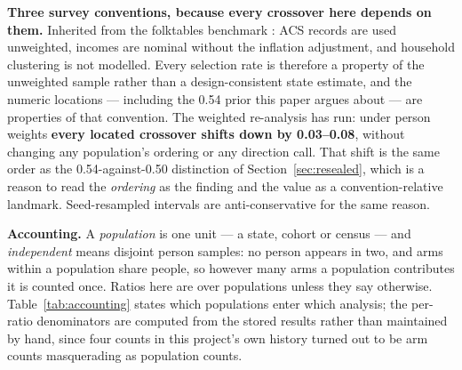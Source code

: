 \documentclass[conference]{IEEEtran}
\begin{document}
\textbf{Three survey conventions, because every crossover here depends on them.} Inherited
from the folktables benchmark \cite{ding2021}: ACS records are used unweighted, incomes are
nominal without the inflation adjustment, and household clustering is not modelled. Every
selection rate is therefore a property of the unweighted sample rather than a
design-consistent state estimate, and the numeric locations --- including the 0.54 prior this
paper argues about --- are properties of that convention. The weighted re-analysis has run:
under person weights \textbf{every located crossover shifts down by 0.03--0.08}, without
changing any population's ordering or any direction call. That shift is the same order as the
0.54-against-0.50 distinction of Section~\ref{sec:resealed}, which is a reason to read the
\emph{ordering} as the finding and the value as a convention-relative landmark.
Seed-resampled intervals are anti-conservative for the same reason.

\textbf{Accounting.} A \emph{population} is one unit --- a state, cohort or census --- and
\emph{independent} means disjoint person samples: no person appears in two, and arms within a
population share people, so however many arms a population contributes it is counted once.
Ratios here are over populations unless they say otherwise. Table~\ref{tab:accounting} states
which populations enter which analysis; the per-ratio denominators are computed from the
stored results rather than maintained by hand, since four counts in this project's own history
turned out to be arm counts masquerading as population counts.
\end{document}

